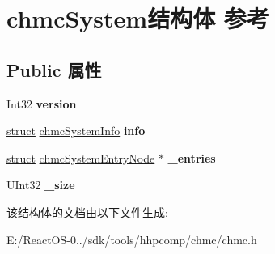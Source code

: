 \hypertarget{structchmc_system}{}\section{chmc\+System结构体 参考}
\label{structchmc_system}
\subsection*{Public 属性}
\begin{DoxyCompactItemize}
\item 
\mbox{\label{structchmc_system_a7419a646ce0eb46e1880618dfe71bc67}} 
Int32 {\bfseries version}
\item 
\mbox{\label{structchmc_system_a187339aa6d80d4b2872413aee74565c5}} 
\hyperlink{interfacestruct}{struct} \hyperlink{structchmc_system_info}{chmc\+System\+Info} {\bfseries info}
\item 
\mbox{\label{structchmc_system_a98e046cf76c46ffe350845c2118a68b7}} 
\hyperlink{interfacestruct}{struct} \hyperlink{structchmc_system_entry_node}{chmc\+System\+Entry\+Node} $\ast$ {\bfseries \+\_\+entries}
\item 
\mbox{\label{structchmc_system_a72811a3850c6a86e279614568bfdb231}} 
U\+Int32 {\bfseries \+\_\+size}
\end{DoxyCompactItemize}


该结构体的文档由以下文件生成\+:\begin{DoxyCompactItemize}
\item 
E\+:/\+React\+O\+S-\/0../sdk/tools/hhpcomp/chmc/chmc.\+h\end{DoxyCompactItemize}
